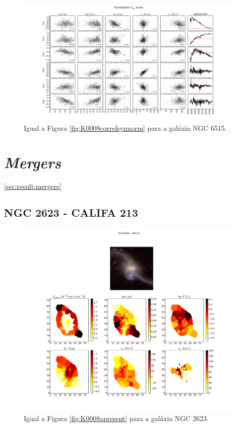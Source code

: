 \begin{figure}
    \includegraphics[width=1.3\textwidth, angle=-90]{figuras/K0864-correl-f_syn_norm-PCvsPhys.pdf}
	\caption[Correlações PCs vs. par\^ametros f\'isicos - $F_{syn}$ norm. - NGC 6515.]
	{Igual a Figura \ref{fig:K0008correfsynnorm} para a galáxia NGC 6515.}
    \label{fig:K0864correfsynnorm}
\end{figure}

\section{{\em Mergers}}
\ref{sec:result:mergers}

\subsection{NGC 2623 - CALIFA 213}

\begin{figure}
    \includegraphics[width=1.\textwidth]{figuras/K0213-apresent.pdf}
    \caption[Propriedades f\'isicas da gal\'axia NGC 2623.]
    {Igual a Figura \ref{fig:K0008apresent} para a galáxia NGC 2623.}
    \label{fig:K0213apresent}
\end{figure}

